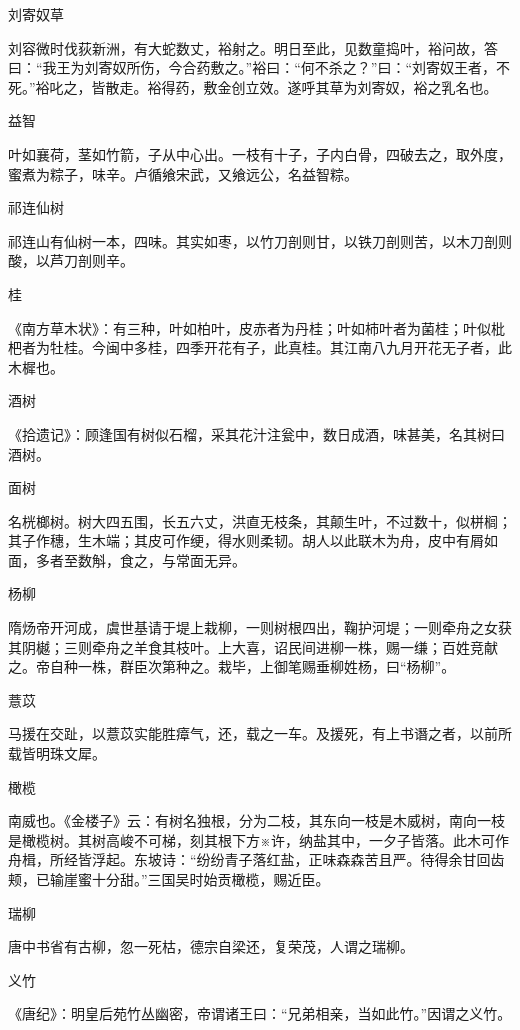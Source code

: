 \documentclass[a4paper,12pt,UTF8,twoside]{ctexbook}
\begin{document}
    刘寄奴草
    
    刘容微时伐荻新洲，有大蛇数丈，裕射之。明日至此，见数童捣叶，裕问故，答曰：“我王为刘寄奴所伤，今合药敷之。”裕曰：“何不杀之？”曰：“刘寄奴王者，不死。”裕叱之，皆散走。裕得药，敷金创立效。遂呼其草为刘寄奴，裕之乳名也。
    
    益智
    
    叶如襄荷，茎如竹箭，子从中心出。一枝有十子，子内白骨，四破去之，取外度，蜜煮为粽子，味辛。卢循飨宋武，又飨远公，名益智粽。
    
    祁连仙树
    
    祁连山有仙树一本，四味。其实如枣，以竹刀剖则甘，以铁刀剖则苦，以木刀剖则酸，以芦刀剖则辛。
    
    桂
    
    《南方草木状》：有三种，叶如柏叶，皮赤者为丹桂；叶如柿叶者为菌桂；叶似枇杷者为牡桂。今闽中多桂，四季开花有子，此真桂。其江南八九月开花无子者，此木樨也。
    
    酒树
    
    《拾遗记》：顾逢国有树似石榴，采其花汁注瓮中，数日成酒，味甚美，名其树曰酒树。
    
    面树
    
    名桄榔树。树大四五围，长五六丈，洪直无枝条，其颠生叶，不过数十，似栟榈；其子作穗，生木端；其皮可作绠，得水则柔韧。胡人以此联木为舟，皮中有屑如面，多者至数斛，食之，与常面无异。
    
    杨柳
    
    隋炀帝开河成，虞世基请于堤上栽柳，一则树根四出，鞠护河堤；一则牵舟之女获其阴樾；三则牵舟之羊食其枝叶。上大喜，诏民间进柳一株，赐一缣；百姓竞献之。帝自种一株，群臣次第种之。栽毕，上御笔赐垂柳姓杨，曰“杨柳”。
    
    薏苡
    
    马援在交趾，以薏苡实能胜瘴气，还，载之一车。及援死，有上书谮之者，以前所载皆明珠文犀。
    
    橄榄
    
    南威也。《金楼子》云：有树名独根，分为二枝，其东向一枝是木威树，南向一枝是橄榄树。其树高峻不可梯，刻其根下方※许，纳盐其中，一夕子皆落。此木可作舟楫，所经皆浮起。东坡诗：“纷纷青子落红盐，正味森森苦且严。待得余甘回齿颊，已输崖蜜十分甜。”三国吴时始贡橄榄，赐近臣。
    
    瑞柳
    
    唐中书省有古柳，忽一死枯，德宗自梁还，复荣茂，人谓之瑞柳。
    
    义竹
    
    《唐纪》：明皇后苑竹丛幽密，帝谓诸王曰：“兄弟相亲，当如此竹。”因谓之义竹。
    
\end{document}
